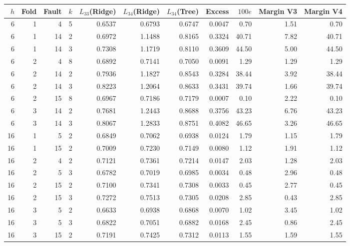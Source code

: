 \begin{tabular}{@{}rrrrrrrrrrr@{}}
\toprule
$h$ & Fold & Fault & $k$ & $L_{33}$(Ridge) & $L_{34}$(Ridge) & $L_{34}$(Tree) & Excess & $100e$ & Margin V3 & Margin V4 \\
\midrule
6 & 1 & 4 & 5 & 0.6537 & 0.6793 & 0.6747 & 0.0047 & 0.70 & 1.51 & 0.70 \\
6 & 1 & 14 & 2 & 0.6972 & 1.1488 & 0.8165 & 0.3324 & 40.71 & 7.82 & 40.71 \\
6 & 1 & 14 & 3 & 0.7308 & 1.1719 & 0.8110 & 0.3609 & 44.50 & 5.00 & 44.50 \\
6 & 2 & 4 & 8 & 0.6892 & 0.7141 & 0.7050 & 0.0091 & 1.29 & 1.29 & 1.29 \\
6 & 2 & 14 & 2 & 0.7936 & 1.1827 & 0.8543 & 0.3284 & 38.44 & 3.92 & 38.44 \\
6 & 2 & 14 & 3 & 0.8223 & 1.2064 & 0.8633 & 0.3431 & 39.74 & 1.66 & 39.74 \\
6 & 2 & 15 & 8 & 0.6967 & 0.7186 & 0.7179 & 0.0007 & 0.10 & 2.22 & 0.10 \\
6 & 3 & 14 & 2 & 0.7681 & 1.2443 & 0.8688 & 0.3756 & 43.23 & 6.76 & 43.23 \\
6 & 3 & 14 & 3 & 0.8067 & 1.2833 & 0.8751 & 0.4082 & 46.65 & 3.26 & 46.65 \\
16 & 1 & 5 & 2 & 0.6849 & 0.7062 & 0.6938 & 0.0124 & 1.79 & 1.15 & 1.79 \\
16 & 1 & 15 & 2 & 0.7009 & 0.7230 & 0.7149 & 0.0080 & 1.12 & 1.91 & 1.12 \\
16 & 2 & 4 & 2 & 0.7121 & 0.7361 & 0.7214 & 0.0147 & 2.03 & 1.28 & 2.03 \\
16 & 2 & 5 & 3 & 0.6782 & 0.7019 & 0.6985 & 0.0034 & 0.48 & 2.96 & 0.48 \\
16 & 2 & 15 & 2 & 0.7100 & 0.7341 & 0.7308 & 0.0033 & 0.45 & 2.77 & 0.45 \\
16 & 2 & 15 & 3 & 0.7272 & 0.7513 & 0.7305 & 0.0208 & 2.85 & 0.43 & 2.85 \\
16 & 3 & 5 & 2 & 0.6633 & 0.6938 & 0.6868 & 0.0070 & 1.02 & 3.45 & 1.02 \\
16 & 3 & 5 & 3 & 0.6822 & 0.7051 & 0.6882 & 0.0168 & 2.45 & 0.86 & 2.45 \\
16 & 3 & 15 & 2 & 0.7191 & 0.7425 & 0.7312 & 0.0113 & 1.55 & 1.59 & 1.55 \\
\bottomrule
\end{tabular}
